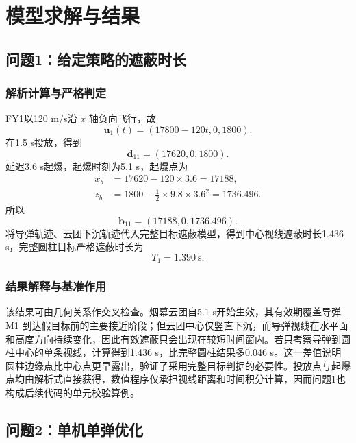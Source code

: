 \documentclass[12pt,a4paper]{ctexart}
\begin{document}
\section{模型求解与结果}

\subsection{问题1：给定策略的遮蔽时长}

\subsubsection{解析计算与严格判定}

FY1以120 m/s沿 $x$ 轴负向飞行，故
\begin{equation}
\bm u_1(t)=(17800-120t,0,1800).
\end{equation}
在1.5 s投放，得到
\begin{equation}
\bm d_{11}=(17620,0,1800).
\end{equation}
延迟3.6 s起爆，起爆时刻为5.1 s，起爆点为
\begin{align}
x_b&=17620-120\times3.6=17188,\\
z_b&=1800-\frac12\times9.8\times3.6^2=1736.496.
\end{align}
所以
\begin{equation}
\bm b_{11}=(17188,0,1736.496).
\end{equation}
将导弹轨迹、云团下沉轨迹代入完整目标遮蔽模型，得到中心视线遮蔽时长1.436 s，完整圆柱目标严格遮蔽时长为
\begin{equation}
\boxed{T_1=1.390\ \mathrm{s}}.
\end{equation}

\subsubsection{结果解释与基准作用}

该结果可由几何关系作交叉检查。烟幕云团自5.1 s开始生效，其有效期覆盖导弹 M1 到达假目标前的主要接近阶段；但云团中心仅竖直下沉，而导弹视线在水平面和高度方向持续变化，因此有效遮蔽只会出现在较短时间窗内。若只考察导弹到圆柱中心的单条视线，计算得到1.436 s，比完整圆柱结果多0.046 s。这一差值说明圆柱边缘点比中心点更早露出，验证了采用完整目标判据的必要性。投放点与起爆点均由解析式直接获得，数值程序仅承担视线距离和时间积分计算，因而问题1也构成后续代码的单元校验算例。

\subsection{问题2：单机单弹优化}
\end{document}
